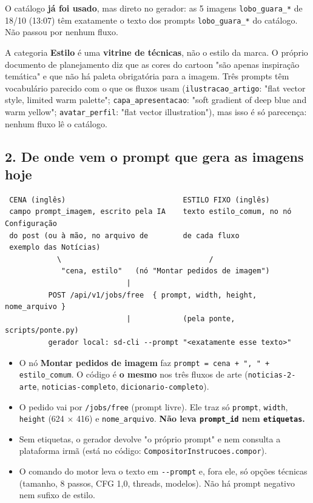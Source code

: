 O catálogo \textbf{já foi usado}, mas direto no gerador: as 5 imagens \nolinkurl{lobo_guara_*} de 18/10 (13:07) têm exatamente o texto dos prompts \nolinkurl{lobo_guara_*} do catálogo. Não passou por nenhum fluxo.

A categoria \textbf{Estilo} é uma \textbf{vitrine de técnicas}, não o estilo da marca. O próprio documento de planejamento diz que as cores do cartoon "são apenas inspiração temática" e que não há paleta obrigatória para a imagem. Três prompts têm vocabulário parecido com o que os fluxos usam (\nolinkurl{ilustracao_artigo}: "flat vector style, limited warm palette"; \nolinkurl{capa_apresentacao}: "soft gradient of deep blue and warm yellow"; \nolinkurl{avatar_perfil}: "flat vector illustration"), mas isso é só parecença: nenhum fluxo lê o catálogo.

\subsection*{2. De onde vem o prompt que gera as imagens hoje}

\begin{lstlisting}
 CENA (inglês)                           ESTILO FIXO (inglês)
 campo prompt_imagem, escrito pela IA    texto estilo_comum, no nó Configuração
 do post (ou à mão, no arquivo de        de cada fluxo
 exemplo das Notícias)
            \                                  /
             "cena, estilo"   (nó "Montar pedidos de imagem")
                            |
          POST /api/v1/jobs/free  { prompt, width, height, nome_arquivo }
                            |            (pela ponte, scripts/ponte.py)
          gerador local: sd-cli --prompt "<exatamente esse texto>"
\end{lstlisting}

\begin{itemize}
\item 
O nó \textbf{Montar pedidos de imagem} faz \texttt{prompt = cena + ", " + estilo\_comum}. O código é \textbf{o mesmo} nos três fluxos de arte (\nolinkurl{noticias-2-arte}, \nolinkurl{noticias-completo}, \nolinkurl{dicionario-completo}).


\item 
O pedido vai por \nolinkurl{/jobs/free} (prompt livre). Ele traz só \texttt{prompt}, \texttt{width}, \texttt{height} (624 × 416) e \nolinkurl{nome_arquivo}. \textbf{Não leva \nolinkurl{prompt_id} nem \texttt{etiquetas}.}


\item 
Sem etiquetas, o gerador devolve "o próprio prompt" e nem consulta a plataforma irmã (está no código: \texttt{CompositorInstrucoes.compor}).


\item 
O comando do motor leva o texto em \nolinkurl{--prompt} e, fora ele, só opções técnicas (tamanho, 8 passos, CFG 1,0, threads, modelos). Não há prompt negativo nem sufixo de estilo.


\end{itemize}

